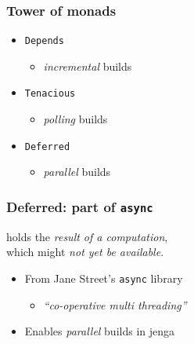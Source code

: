 \documentclass{beamer}
\begin{document}

\begin{frame}[fragile]
\frametitle{Tower of monads}
\begin{itemize}
\item {\tt Depends}
\begin{itemize}
\item {\em incremental}\/ builds
\end{itemize}
\item {\tt Tenacious}
\begin{itemize}
\item { \em polling}\/ builds
\end{itemize}
\item {\tt Deferred}
\begin{itemize}
\item {\em parallel}\/ builds
\end{itemize}
\end{itemize}
\end{frame}

%
%
%
%


\begin{frame}[fragile]
\huge
\begin{center}
\end{center}
\end{frame}



\begin{frame}[fragile]
\frametitle{Deferred: part of {\tt async}}
\begin{center}
\vskip16pt
holds the {\em result of a computation},\\\vskip-4pt which might {\em not yet be available}.
\end{center}
\begin{itemize}
\item From Jane Street's {\tt async} library
\begin{itemize}
\item {\em ``co-operative multi threading''}
\end{itemize}
\item Enables {\em parallel}\/ builds in jenga
\end{itemize}
\end{frame}
\end{document}
